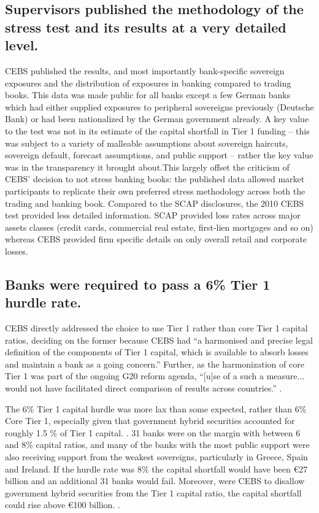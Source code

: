 \documentclass[12pt]{article}
\begin{document}
\subsection{Supervisors published the methodology of the stress test and its results at a very detailed level.}

CEBS published the results, and most importantly bank-specific sovereign exposures and the distribution of exposures in banking compared to trading books. This data was made public for all banks except a few German banks which had either supplied exposures to peripheral sovereigns previously (Deutsche Bank) or had been nationalized by the German government already. A key value to the test was not in its estimate of the capital shortfall in Tier 1 funding -- this was subject to a variety of malleable assumptions about sovereign haircuts, sovereign default, forecast assumptions, and public support -- rather the key value was in the transparency it brought about.This largely offset the criticism of CEBS' decision to not stress banking books: the published data allowed market participants to replicate their own preferred stress methodology across both the trading and banking book. Compared to the SCAP disclosures, the 2010 CEBS test provided less detailed information. SCAP provided loss rates across major assets classes (credit cards, commercial real estate, first-lien mortgages and so on) whereas CEBS provided firm specific details on only overall retail and corporate losses.

\subsection{Banks were required to pass a 6\% Tier 1 hurdle rate.}

CEBS directly addressed the choice to use Tier 1 rather than core Tier 1 capital ratios, deciding on the former because CEBS had ``a harmonised and precise legal definition of the components of Tier 1 capital, which is available to absorb losses and maintain a bank as a going concern.'' Further, as the harmonization of core Tier 1 was part of the ongoing G20 reform agenda, ``[u]se of a such a measure... would not have facilitated direct comparison of results across countries.'' \citep{QA}.

The 6\% Tier 1 capital hurdle was more lax than some expected, rather than 6\% Core Tier 1, especially given that government hybrid securities accounted for roughly 1.5 \% of Tier 1 capital. \citep{Gonzalez}. 31 banks were on the margin with between 6 and 8\% capital ratios, and many of the banks with the most public support were also receiving support from the weakest sovereigns, particularly in Greece, Spain and Ireland. If the hurdle rate was 8\% the capital shortfall would have been \euro{27} billion and an additional 31 banks would fail. Moreover, were CEBS to disallow government hybrid securities from the Tier 1 capital ratio, the capital shortfall could rise above \euro{100} billion. \citep{Spick}.
\end{document}
